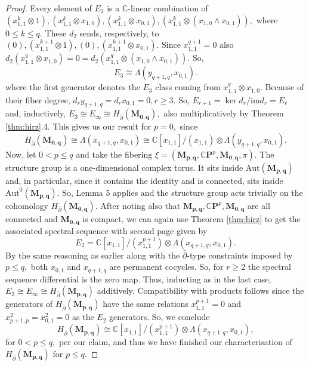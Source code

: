 \begin{proof}
    Every element of $E_2$ is a $\mathbb{C}$-linear combination of $(x_{1,1}^k\otimes 1), (x_{1,1}^k\otimes x_{1,0}), (x_{1,1}^k \otimes x_{0,1}), (x_{1,1}^k\otimes (x_{1,0}\wedge x_{0,1})),$ where $0\le k \le q.$ These $d_2$ sends, respectively, to $(0), (x_{1,1}^{k+1}\otimes 1),(0), (x_{1,1}^{k+1} \otimes x_{0,1}).$ Since $x_{1,1}^{q+1} = 0$ also $d_2(x_{1,1}^q  \otimes x_{1,0})=0=d_2(x_{1,1}^q \otimes (x_{1,0} \wedge x_{0,1})).$ So,
    \[
    E_3 \cong \Lambda (y_{q+1, q}, x_{0,1}).
    \]
    where the first generator denotes the $E_3$ class coming from $x_{1,1}^{q}\otimes x_{1,0}.$ Because of their fiber degree, $d_r y_{q+1, q} = d_r x_{0,1} = 0, r\ge 3.$ So, $E_{r+1} = \ker d_r/\mathrm{im} d_r = E_r$ and, inductively, $E_3 \cong E_\infty \cong H_{\bar \partial}(\mathbf{M_{0,q}}),$ also multiplicatively by Theorem \ref{thm:hirz}.4. This gives us our result for $p=0,$ since 
    \[
    H_{\bar \partial}(\mathbf{M_{0,q}}) \cong \Lambda (x_{q+1, q}, x_{0,1}) \cong \mathbb{C}[x_{1,1}]/(x_{1,1}) \otimes \Lambda (y_{q+1, q}, x_{0,1}).
    \]
    Now, let $0<p\le q$ and take the fibering $\xi = (\mathbf{M_{p,q}}, \mathbb{C}\mathbf{P}^p, \mathbf{M_{0,q}}, \pi).$ The structure group is a one-dimensional complex torus. It sits inside $\mathrm{Aut}(\mathbf{M_{p,q}})$ and, in particular, since it contains the identity and is connected, sits inside $\mathrm{Aut}^0(\mathbf{M_{p,q}}).$ So, Lemma 5 applies and the structure group acts trivially on the cohomology $H_{\bar \partial}(\mathbf{M_{0,q}}).$ After noting also that $\mathbf{M_{p,q}}, \mathbb{C}\mathbf{P}^p, \mathbf{M_{0,q}}$ are all connected and $\mathbf{M_{0,q}}$ is compact, we can again use Theorem \ref{thm:hirz} to get the associated spectral sequence with second page given by
    \[
    E_2 = \mathbb{C}[x_{1,1}]/(x^{p+1}_{1,1}) \otimes \Lambda(x_{q+1, q}, x_{0,1}).
    \]
    By the same reasoning as earlier along with the $\bar\partial$-type constraints imposed by $p \le q,$ both $x_{0,1}$ and $x_{q+1, q}$ are permanent cocycles. So, for $r\ge 2$ the spectral sequence differential is the zero map. Thus, inducting as in the last case, $E_2 \cong E_\infty \cong H_{\bar \partial} (\mathbf{M_{p,q}})$ additively. Compatibility with products follows since the generators of $H_{\bar\partial}(\mathbf{M_{p,q}})$ have the same relations $x_{1,1}^{p+1} = 0$ and $x_{p+1, p}^2 = x_{0,1}^2 = 0$ as the $E_2$ generators. So, we conclude
    \[
    H_{\bar\partial}(\mathbf{M_{p,q}}) \cong \mathbb{C}[x_{1,1}]/(x^{p+1}_{1,1}) \otimes \Lambda(x_{q+1, q}, x_{0,1}),
    \]
    for $0<p\le q,$ per our claim, and thus we have finished our characterisation of $H_{\bar\partial}(\mathbf{M_{p,q}})$ for $p\le q.$
\end{proof}

